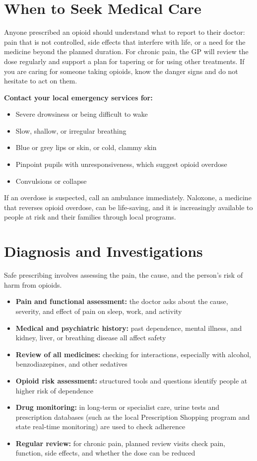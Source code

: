 \section*{When to Seek Medical Care}
Anyone prescribed an opioid should understand what to report to their doctor: pain that is not controlled, side effects that interfere with life, or a need for the medicine beyond the planned duration. For chronic pain, the GP will review the dose regularly and support a plan for tapering or for using other treatments. If you are caring for someone taking opioids, know the danger signs and do not hesitate to act on them.

\textbf{Contact your local emergency services for:}
\begin{itemize}
    \item Severe drowsiness or being difficult to wake
    \item Slow, shallow, or irregular breathing
    \item Blue or grey lips or skin, or cold, clammy skin
    \item Pinpoint pupils with unresponsiveness, which suggest opioid overdose
    \item Convulsions or collapse
\end{itemize}
If an overdose is suspected, call an ambulance immediately. Naloxone, a medicine that reverses opioid overdose, can be life-saving, and it is increasingly available to people at risk and their families through local programs.

\section*{Diagnosis and Investigations}
Safe prescribing involves assessing the pain, the cause, and the person's risk of harm from opioids.

\begin{itemize}
    \item \textbf{Pain and functional assessment:} the doctor asks about the cause, severity, and effect of pain on sleep, work, and activity
    \item \textbf{Medical and psychiatric history:} past dependence, mental illness, and kidney, liver, or breathing disease all affect safety
    \item \textbf{Review of all medicines:} checking for interactions, especially with alcohol, benzodiazepines, and other sedatives
    \item \textbf{Opioid risk assessment:} structured tools and questions identify people at higher risk of dependence
    \item \textbf{Drug monitoring:} in long-term or specialist care, urine tests and prescription databases (such as the local Prescription Shopping program and state real-time monitoring) are used to check adherence
    \item \textbf{Regular review:} for chronic pain, planned review visits check pain, function, side effects, and whether the dose can be reduced
\end{itemize}

